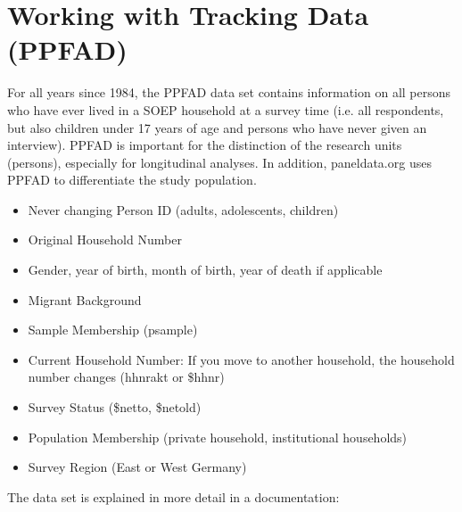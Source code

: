 \documentclass[letterpaper,10pt,openany,onesideH,english]{sphinxmanual}
\begin{document}
\section{Working with Tracking Data (PPFAD)}
\label{\detokenize{Working with SOEP Data/index:working-with-tracking-data-ppfad}}\label{\detokenize{Working with SOEP Data/index:working-ppfad}}
For all years since 1984, the PPFAD data set contains information on all persons who have ever lived in a SOEP household at a survey time (i.e. all respondents, but also children under 17 years of age and persons who have never given an interview). PPFAD is important for the distinction of the research units (persons), especially for longitudinal analyses. In addition, paneldata.org uses PPFAD to differentiate the study population.

\begin{itemize}
\item {} 
Never changing Person ID (adults, adolescents, children)

\item {} 
Original Household Number

\item {} 
Gender, year of birth, month of birth, year of death if applicable

\item {} 
Migrant Background

\item {} 
Sample Membership (psample)

\end{itemize}

\begin{itemize}
\item {} 
Current Household Number: If you move to another household, the household number changes (hhnrakt or \$hhnr)

\item {} 
Survey Status (\$netto, \$netold)

\item {} 
Population Membership (private household, institutional households)

\item {} 
Survey Region (East or West Germany)

\end{itemize}

The data set is explained in more detail in a documentation:
\end{document}
